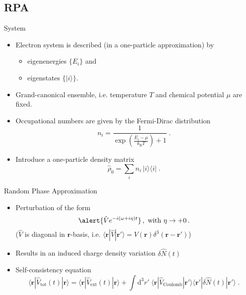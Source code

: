 \documentclass{beamer}
\begin{document}
\subsection{RPA}

\begin{frame}{System}
    \begin{itemize}
    \item<1-> Electron system is described (in a one-particle approximation) by
        \begin{itemize}
        \item \alert{eigenenergies $\{E_i\}$} and
        \item \alert{eigenstates $\{|i\rangle\}$}.
        \end{itemize}
    \item<2-> Grand-canonical ensemble, i.e. \alert{temperature} $T$ and \alert{chemical potential} $\mu$ are fixed.
    \item<3-> Occupational numbers are given by the \alert{Fermi-Dirac distribution}
        \[ n_i = \frac{1}{\exp\!\left(\frac{E_i - \mu}{k_\text{B}\!T}\right) + 1} \;.\]
    \item<4-> Introduce a one-particle density matrix
        \[ \hat\rho_0 = \sum_i n_i\, |i\rangle\!\langle i| \;.\]
    \end{itemize}
\end{frame}

\begin{frame}{Random Phase Approximation}
    \begin{itemize}
    \item<1-> Perturbation of the form
        \[ \alert{\hat V e^{-i(\omega + i\eta)t}}\,,\text{ with }\eta \to +0\,. \]
        \small{($\hat V$ is diagonal in $\mathbf{r}$-basis, i.e. $\langle\mathbf{r}|\hat V|\mathbf{r'}\rangle = V(\mathbf{r})\delta^3(\mathbf{r} - \mathbf{r'})$)}
    \item<2-> Results in an induced charge density variation $\delta\hat N(t)$
    \item<3-> \alert{Self-consistency equation}
        \[ \langle \mathbf{r} | \hat V_\text{tot}(t) | \mathbf{r} \rangle
            = \langle \mathbf{r} | \hat V_\text{ext}(t) | \mathbf{r} \rangle + \int\!\! \text{d}^3 r' \; \langle \mathbf{r} | \hat V_\text{Coulomb} | \mathbf{r'} \rangle \langle \mathbf{r'} | \delta\hat N(t) | \mathbf{r'} \rangle \;. \]
    \end{itemize}
\end{frame}
\end{document}
